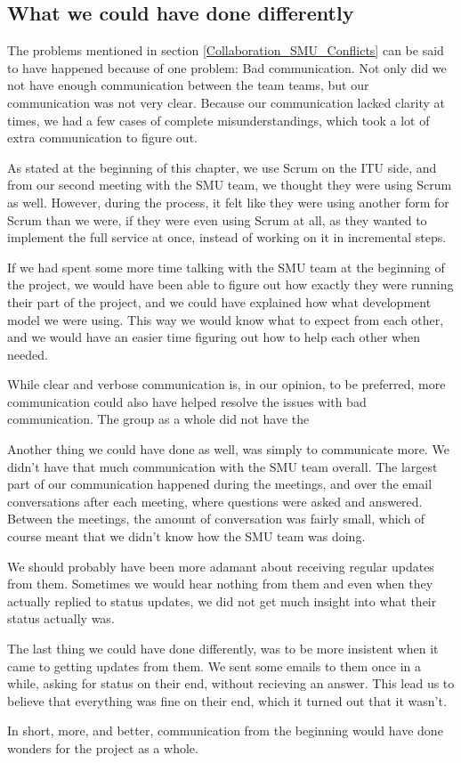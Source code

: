 \subsection{What we could have done differently}
\label{Collaboration_SMU_CouldHave}
The problems mentioned in section \ref{Collaboration_SMU_Conflicts} can be said to have happened because of one problem: Bad communication. Not only did we not have enough communication between the team teams, but our communication was not very clear. Because our communication lacked clarity at times, we had a few cases of complete misunderstandings, which took a lot of extra communication to figure out.

As stated at the beginning of this chapter, we use Scrum on the ITU side, and from our second meeting with the SMU team, we thought  they were using Scrum as well. However, during the process, it felt like they were using another form for Scrum than we were, if they were even using Scrum at all, as they wanted to implement the full service at once, instead of working on it in incremental steps.

If we had spent some more time talking with the SMU team at the beginning of the project, we would have been able to figure out how exactly they were running their part of the project, and we could have explained how what development model we were using. This way we would know what to expect from each other, and we would have an easier time figuring out how to help each other when needed.

While clear and verbose communication is, in our opinion, to be preferred, more communication could also have helped resolve the issues with bad communication. The group as a whole did not have the 

Another thing we could have done as well, was simply to communicate more. We didn't have that much communication with the SMU team overall. The largest part of our communication happened during the meetings, and over the email conversations after each meeting, where questions were asked and answered. Between the meetings, the amount of conversation was fairly small, which of course meant that we didn't know how the SMU team was doing.

We should probably have been more adamant about receiving regular updates from them. Sometimes we would hear nothing from them and even when they actually replied to status updates, we did not get much insight into what their status actually was.

The last thing we could have done differently, was to be more insistent when it came to getting updates from them. We sent some emails to them once in a while, asking for status on their end, without recieving an answer. This lead us to believe that everything was fine on their end, which it turned out that it wasn't.	

In short, more, and better, communication from the beginning would have done wonders for the project as a whole.